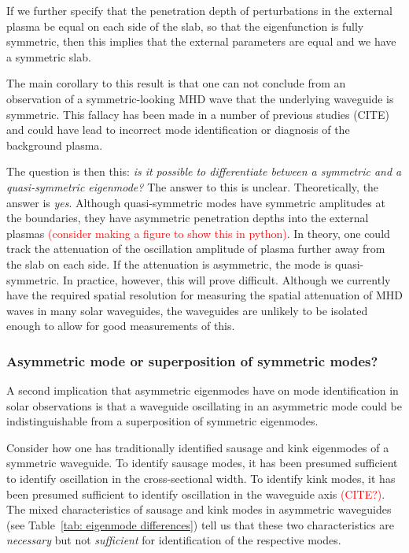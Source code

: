\documentclass[12pt]{../style-files/ociamthesis}
\begin{document}
If we further specify that the penetration depth of perturbations in the external plasma be equal on each side of the slab, so that the eigenfunction is fully symmetric, then this implies that the external parameters are equal and we have a symmetric slab.

The main corollary to this result is that one can not conclude from an observation of a symmetric-looking MHD wave that the underlying waveguide is symmetric. This fallacy has been made in a number of previous studies (CITE) and could have lead to incorrect mode identification or diagnosis of the background plasma.

The question is then this: \textit{is it possible to differentiate between a symmetric and a quasi-symmetric eigenmode?} The answer to this is unclear. Theoretically, the answer is \textit{yes}. Although quasi-symmetric modes have symmetric amplitudes at the boundaries, they have asymmetric penetration depths into the external plasmas \textcolor{red}{(consider making a figure to show this in python)}. In theory, one could track the attenuation of the oscillation amplitude of plasma further away from the slab on each side. If the attenuation is asymmetric, the mode is quasi-symmetric. In practice, however, this will prove difficult. Although we currently have the required spatial resolution for measuring the spatial attenuation of MHD waves in many solar waveguides, the waveguides are unlikely to be isolated enough to allow for good measurements of this.


\subsubsection{Asymmetric mode or superposition of symmetric modes?}

A second implication that asymmetric eigenmodes have on mode identification in solar observations is that a waveguide oscillating in an asymmetric mode could be indistinguishable from a superposition of symmetric eigenmodes.

Consider how one has traditionally identified sausage and kink eigenmodes of a symmetric waveguide. To identify sausage modes, it has been presumed sufficient to identify oscillation in the cross-sectional width. To identify kink modes, it has been presumed sufficient to identify oscillation in the waveguide axis \textcolor{red}{(CITE?)}. The mixed characteristics of sausage and kink modes in asymmetric waveguides (see Table~\ref{tab: eigenmode differences}) tell us that these two characteristics are \textit{necessary} but not \textit{sufficient} for identification of the respective modes.
\end{document}
